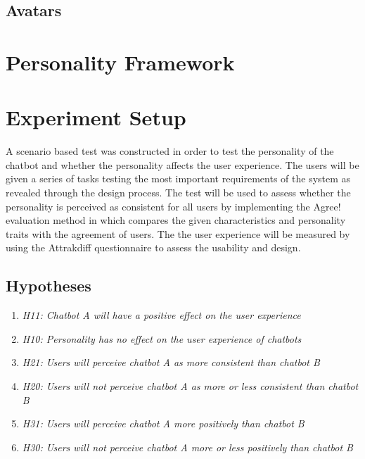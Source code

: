     \subsection{Avatars}
    
\vspace{5mm} %

\section{Personality Framework}

\vspace{5mm} %

\section{Experiment Setup}

A scenario based test was constructed in order to test the personality of the chatbot and whether the personality affects the user experience. The users will be given a series of tasks testing the most important requirements of the system as revealed through the design process. The test will be used to assess whether the personality is perceived as consistent for all users by implementing the Agree! evaluation method in which compares the given characteristics and personality traits with the agreement of users. The the user experience will be measured by using the Attrakdiff questionnaire to assess the usability and design. 

\vspace{5mm} %

    \subsection{Hypotheses}
 
    \begin{enumerate}
         \item \textit {H11: Chatbot A will have a positive effect on the user experience}
        \item \textit {H10: Personality has no effect on the user experience of chatbots}
        \item \textit {H21: Users will perceive chatbot A as more consistent than chatbot B}
        \item  \textit {H20: Users will not perceive chatbot A as more or less consistent than chatbot B} 
        \item \textit {H31: Users will perceive chatbot A more positively than chatbot B}
        \item \textit {H30: Users will not perceive chatbot A more or less positively than chatbot B}
    \end{enumerate}
    
